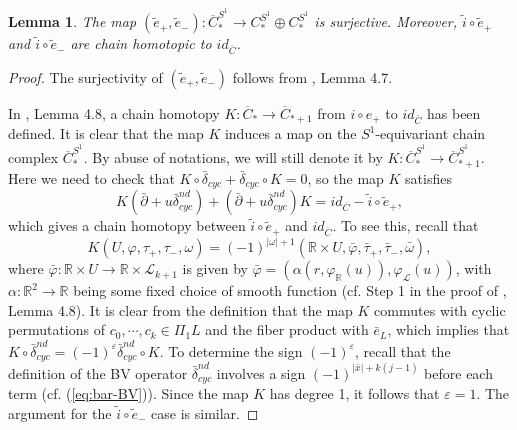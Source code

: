 \documentclass[a4paper]{article}
\newtheorem{lemma}[theorem]{Lemma}
\numberwithin{equation}{section}
\begin{document}
\begin{lemma}\label{lemma:surjective}
The map $(\tilde{e}_+,\tilde{e}_-):\overline{C}_\ast^{S^1}\rightarrow C_\ast^{S^1}\oplus C_\ast^{S^1}$ is surjective. Moreover, $\tilde{i}\circ\tilde{e}_+$ and $\tilde{i}\circ\tilde{e}_-$ are chain homotopic to $\mathit{id}_{\overline{C}}$.
\end{lemma}
\begin{proof}
The surjectivity of $(\tilde{e}_+,\tilde{e}_-)$ follows from \cite{ki2}, Lemma 4.7. 

In \cite{ki2}, Lemma 4.8, a chain homotopy $K:\overline{C}_\ast\rightarrow\overline{C}_{\ast+1}$ from $i\circ e_+$ to $\mathit{id}_{\overline{C}}$ has been defined. It is clear that the map $K$ induces a map on the $S^1$-equivariant chain complex $\overline{C}_\ast^{S^1}$. By abuse of notations, we will still denote it by $K:\overline{C}_\ast^{S^1}\rightarrow\overline{C}_{\ast+1}^{S^1}$. Here we need to check that $K\circ\bar{\delta}_\mathit{cyc}+\bar{\delta}_\mathit{cyc}\circ K=0$, so the map $K$ satisfies
\begin{equation}
K(\bar{\partial}+u\bar{\delta}_\mathit{cyc}^\mathit{nd})+(\bar{\partial}+u\bar{\delta}_\mathit{cyc}^\mathit{nd})K=\mathit{id}_{\overline{C}}-\tilde{i}\circ\tilde{e}_+,
\end{equation}
which gives a chain homotopy between $\tilde{i}\circ\tilde{e}_+$ and $\mathit{id}_{\overline{C}}$. To see this, recall that
\begin{equation}
K(U,\varphi,\tau_+,\tau_-,\omega)=(-1)^{|\omega|+1}(\mathbb{R}\times U,\bar{\varphi},\bar{\tau}_+,\bar{\tau}_-,\bar{\omega}),
\end{equation}
where $\bar{\varphi}:\mathbb{R}\times U\rightarrow\mathbb{R}\times\mathcal{L}_{k+1}$ is given by $\bar{\varphi}=\left(\alpha\left(r,\varphi_\mathbb{R}(u)\right),\varphi_\mathcal{L}(u)\right)$, with $\alpha:\mathbb{R}^2\rightarrow\mathbb{R}$ being some fixed choice of smooth function (cf. Step 1 in the proof of \cite{ki2}, Lemma 4.8). It is clear from the definition that the map $K$ commutes with cyclic permutations of $c_0,\cdots,c_k\in\Pi_1L$ and the fiber product with $\bar{e}_L$, which implies that $K\circ\bar{\delta}_\mathit{cyc}^\mathit{nd}=(-1)^{\varepsilon}\bar{\delta}_\mathit{cyc}^\mathit{nd}\circ K$. To determine the sign $(-1)^{\varepsilon}$, recall that the definition of the BV operator $\bar{\delta}_\mathit{cyc}^\mathit{nd}$ involves a sign $(-1)^{|\bar{x}|+k(j-1)}$ before each term (cf. (\ref{eq:bar-BV})). Since the map $K$ has degree 1, it follows that $\varepsilon=1$. The argument for the $\tilde{i}\circ\tilde{e}_-$ case is similar.
\end{proof}
\end{document}
